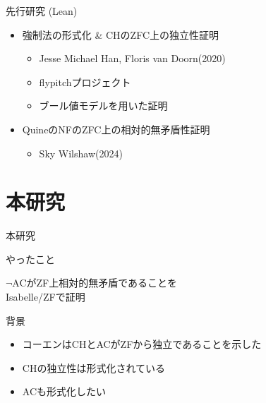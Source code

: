 \documentclass[17pt,aspectratio=169]{beamer}
\begin{document}
\begin{frame}{先行研究 (Lean)}
    \vspace{10pt}

    \begin{itemize}
        \item 強制法の形式化 \& CHのZFC上の独立性証明
              {\small \begin{itemize}
                  \item Jesse Michael Han, Floris van Doorn(2020)
                  \item flypitchプロジェクト
                  \item ブール値モデルを用いた証明
              \end{itemize} }

        \item QuineのNFのZFC上の相対的無矛盾性証明
              {\small \begin{itemize}
                  \item Sky Wilshaw(2024)
              \end{itemize} }

    \end{itemize}
\end{frame}

\section{本研究}

\begin{frame}{本研究}
    \begin{itembox}[l]{やったこと}
        \begin{center}
            $\neg$ACがZF上相対的無矛盾であることを\\Isabelle/ZFで証明
        \end{center}
    \end{itembox}

    背景
    \vspace{-10pt}
    {\small
        \begin{itemize}
            \setlength{\itemsep}{1pt}
            \item コーエンはCHとACがZFから独立であることを示した
            \item CHの独立性は形式化されている
            \item ACも形式化したい
        \end{itemize}

    }
\end{frame}
\end{document}
